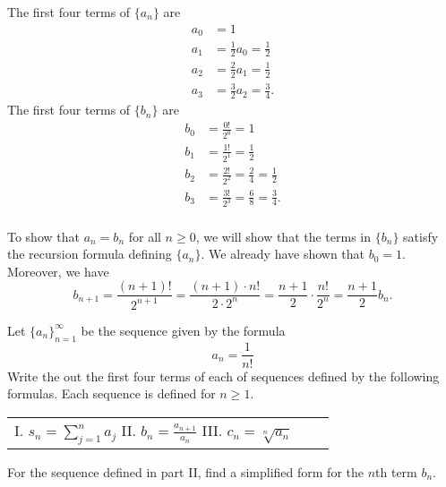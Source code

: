 \documentclass[]{ximera}
\begin{document}
\begin{freeResponse}
The first four terms of $\{a_n\}$ are
\begin{align*}
a_0 &= 1 \\
a_1 &= \frac{1}{2} a_0 = \frac{1}{2} \\
a_2 &= \frac{2}{2} a_1 = \frac{1}{2} \\
a_3 &= \frac{3}{2} a_2 = \frac{3}{4}.
\end{align*}
The first four terms of $\{b_n\}$ are 
\begin{align*}
b_0 &= \frac{0!}{2^0} = 1\\
b_1 &= \frac{1!}{2^1} = \frac{1}{2}\\
b_2 &= \frac{2!}{2^2} = \frac{2}{4} = \frac{1}{2} \\
b_3 &= \frac{3!}{2^3} = \frac{6}{8} = \frac{3}{4}.\\
\end{align*}

To show that $a_n = b_n$ for all $n \geq 0$, we will show that the terms in $\{b_n\}$ satisfy the recursion formula defining $\{a_n\}$. We already have shown that $b_0 = 1$. Moreover, we have
$$
b_{n+1} = \frac{(n+1)!}{2^{n+1}} = \frac{(n+1) \cdot n!}{2 \cdot 2^n} = \frac{n+1}{2} \cdot \frac{n!}{2^n} = \frac{n+1}{2} b_n.
$$
\end{freeResponse}

\pagebreak

\begin{problem}
Let $\{a_n\}_{n=1}^\infty$ be the sequence given by the formula 
$$
a_n = \frac{1}{n!}
$$
Write the out the first four terms of each of sequences defined by the following formulas. Each sequence is defined for $n \geq 1$. 
\begin{center}
\begin{tabular}{lll}
I. $s_n = \sum_{j=1}^n a_j$ \hspace{.4in} II. $b_n = \frac{a_{n+1}}{a_n}$ \hspace{.4in} III. $c_n = \sqrt[n]{a_n}$
\end{tabular}
\end{center}
For the sequence defined in part II, find a simplified form for the $n$th term $b_n$. 
\end{problem}
\end{document}
